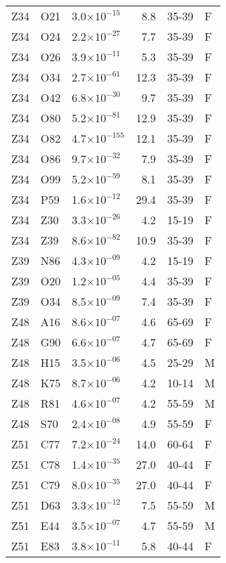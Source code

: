 \begin{longtable}{lllrll}
   Z34 & O21 & 3.0$\times10^{-15}$ & 8.8 & 35-39 & F \\ 
   Z34 & O24 & 2.2$\times10^{-27}$ & 7.7 & 35-39 & F \\ 
   Z34 & O26 & 3.9$\times10^{-11}$ & 5.3 & 35-39 & F \\ 
   Z34 & O34 & 2.7$\times10^{-61}$ & 12.3 & 35-39 & F \\ 
   Z34 & O42 & 6.8$\times10^{-30}$ & 9.7 & 35-39 & F \\ 
   Z34 & O80 & 5.2$\times10^{-81}$ & 12.9 & 35-39 & F \\ 
   Z34 & O82 & 4.7$\times10^{-155}$ & 12.1 & 35-39 & F \\ 
   Z34 & O86 & 9.7$\times10^{-32}$ & 7.9 & 35-39 & F \\ 
   Z34 & O99 & 5.2$\times10^{-59}$ & 8.1 & 35-39 & F \\ 
   Z34 & P59 & 1.6$\times10^{-12}$ & 29.4 & 35-39 & F \\ 
   Z34 & Z30 & 3.3$\times10^{-26}$ & 4.2 & 15-19 & F \\ 
   Z34 & Z39 & 8.6$\times10^{-82}$ & 10.9 & 35-39 & F \\ 
   Z39 & N86 & 4.3$\times10^{-09}$ & 4.2 & 15-19 & F \\ 
   Z39 & O20 & 1.2$\times10^{-05}$ & 4.4 & 35-39 & F \\ 
   Z39 & O34 & 8.5$\times10^{-09}$ & 7.4 & 35-39 & F \\ 
   Z48 & A16 & 8.6$\times10^{-07}$ & 4.6 & 65-69 & F \\ 
   Z48 & G90 & 6.6$\times10^{-07}$ & 4.7 & 65-69 & F \\ 
   Z48 & H15 & 3.5$\times10^{-06}$ & 4.5 & 25-29 & M \\ 
   Z48 & K75 & 8.7$\times10^{-06}$ & 4.2 & 10-14 & M \\ 
   Z48 & R81 & 4.6$\times10^{-07}$ & 4.2 & 55-59 & M \\ 
   Z48 & S70 & 2.4$\times10^{-08}$ & 4.9 & 55-59 & F \\ 
   Z51 & C77 & 7.2$\times10^{-24}$ & 14.0 & 60-64 & F \\ 
   Z51 & C78 & 1.4$\times10^{-35}$ & 27.0 & 40-44 & F \\ 
   Z51 & C79 & 8.0$\times10^{-35}$ & 27.0 & 40-44 & F \\ 
   Z51 & D63 & 3.3$\times10^{-12}$ & 7.5 & 55-59 & M \\ 
   Z51 & E44 & 3.5$\times10^{-07}$ & 4.7 & 55-59 & M \\ 
   Z51 & E83 & 3.8$\times10^{-11}$ & 5.8 & 40-44 & F \\ 

\end{longtable}
